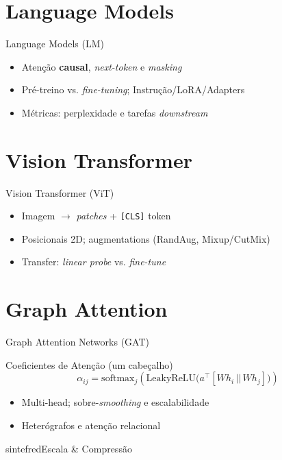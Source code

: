 \documentclass{beamer}
\begin{document}
\section{Language Models}
\begin{frame}{Language Models (LM)}
	\begin{itemize}[<+->]
		\item Atenção \textbf{causal}, \textit{next-token} e \textit{masking}
		\item Pré-treino vs. \textit{fine-tuning}; Instrução/LoRA/Adapters
		\item Métricas: perplexidade e tarefas \textit{downstream}
	\end{itemize}
\end{frame}

\section{Vision Transformer}
\begin{frame}{Vision Transformer (ViT)}
	\begin{itemize}[<+->]
		\item Imagem $\rightarrow$ \textit{patches} + \texttt{[CLS]} token
		\item Posicionais 2D; augmentations (RandAug, Mixup/CutMix)
		\item Transfer: \textit{linear probe} vs. \textit{fine-tune}
	\end{itemize}
\end{frame}

\section{Graph Attention}
\begin{frame}{Graph Attention Networks (GAT)}
	\begin{block}{Coeficientes de Atenção (um cabeçalho)}
		\small
		\[
			\alpha_{ij}=\mathrm{softmax}_j\!\left(\mathrm{LeakyReLU}\!\big(a^\top[Wh_i \,||\, Wh_j]\big)\right)
		\]
	\end{block}
	\begin{itemize}[<+->]
		\item Multi-head; sobre-\textit{smoothing} e escalabilidade
		\item Heterógrafos e atenção relacional
	\end{itemize}
\end{frame}

\begin{chapter}{sintefred}{Escala \& Compressão}\end{chapter}
\end{document}
